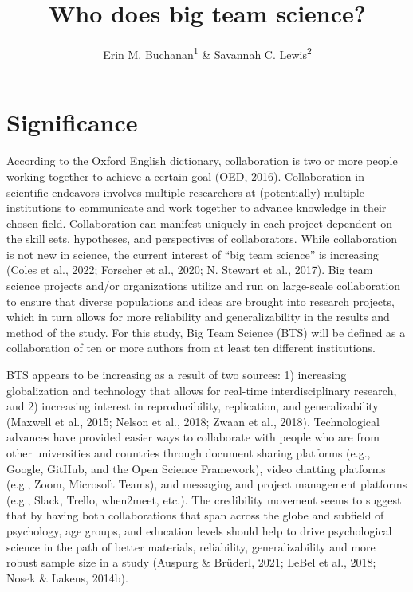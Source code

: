 \documentclass[
  man]{apa7}
\title{Who does big team science?}
\author{Erin M. Buchanan\textsuperscript{1} \& Savannah C. Lewis\textsuperscript{2}}
\date{}
\affiliation{\vspace{0.5cm}\textsuperscript{1} Harrisburg University of Science and Technology\\\textsuperscript{2} University of Alabama}
\begin{document}
\maketitle

\hypertarget{significance}{%
\section{Significance}\label{significance}}

According to the Oxford English dictionary, collaboration is two or more
people working together to achieve a certain goal (OED, 2016).
Collaboration in scientific endeavors involves multiple researchers at
(potentially) multiple institutions to communicate and work together to
advance knowledge in their chosen field. Collaboration can manifest
uniquely in each project dependent on the skill sets, hypotheses, and
perspectives of collaborators. While collaboration is not new in
science, the current interest of ``big team science'' is increasing
(Coles et al., 2022; Forscher et al., 2020; N. Stewart et al., 2017). Big team science projects
and/or organizations utilize and run on large-scale collaboration to
ensure that diverse populations and ideas are brought into research
projects, which in turn allows for more reliability and generalizability
in the results and method of the study. For this study, Big Team Science
(BTS) will be defined as a collaboration of ten or more authors from at
least ten different institutions.

BTS appears to be increasing as a result of two sources: 1) increasing
globalization and technology that allows for real-time interdisciplinary
research, and 2) increasing interest in reproducibility, replication,
and generalizability (Maxwell et al., 2015; Nelson et al., 2018; Zwaan et al., 2018).
Technological advances have provided easier ways to collaborate with
people who are from other universities and countries through document
sharing platforms (e.g., Google, GitHub, and the Open Science
Framework), video chatting platforms (e.g., Zoom, Microsoft Teams), and
messaging and project management platforms (e.g., Slack, Trello,
when2meet, etc.). The credibility movement seems to suggest that by
having both collaborations that span across the globe and subfield of
psychology, age groups, and education levels should help to drive
psychological science in the path of better materials, reliability,
generalizability and more robust sample size in a study
(Auspurg \& Brüderl, 2021; LeBel et al., 2018; Nosek \& Lakens, 2014b).
\end{document}
